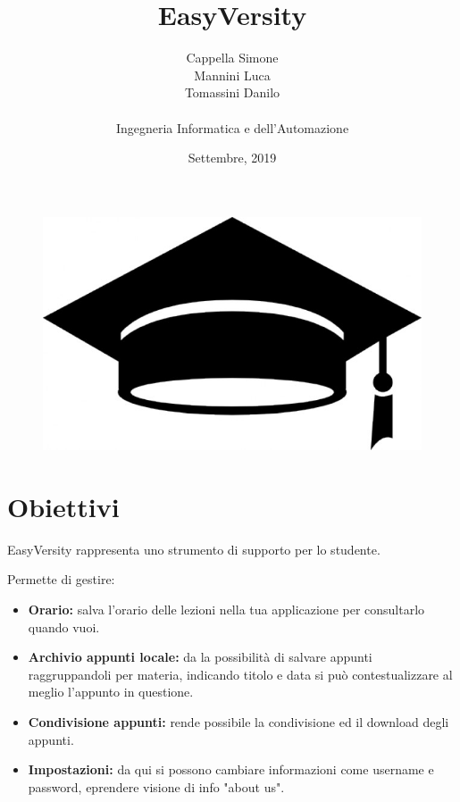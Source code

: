 \documentclass[a4paper, 50pt, twoside]{article}
\begin{document}
\title{EasyVersity}
\date{Settembre, 2019}
\author{Cappella Simone \\ Mannini Luca \\ Tomassini Danilo \\ \\ Ingegneria Informatica e dell'Automazione}
\maketitle
\vspace*{\fill}
\begin{figure}[h!]
	\centering
	\includegraphics[width=\linewidth]{copertina4.jpg}
	\label {fig::copertina}
\end{figure}
\vspace*{\fill}

\newpage
\tableofcontents{}

\newpage
\section{Obiettivi}
EasyVersity rappresenta uno strumento di supporto per lo studente.

Permette di gestire:
\begin{itemize}
\item \textbf{Orario:} salva l'orario delle lezioni nella tua applicazione per consultarlo quando vuoi.
\item \textbf{Archivio appunti locale:} da la possibilità di salvare appunti raggruppandoli per materia, indicando titolo e data si può contestualizzare al meglio l'appunto in questione.
\item \textbf{Condivisione appunti:} rende possibile la condivisione ed il download degli appunti.
\item \textbf{Impostazioni:} da qui si possono cambiare informazioni come username e password, eprendere visione di info "about us".
\end{itemize}
\end{document}

